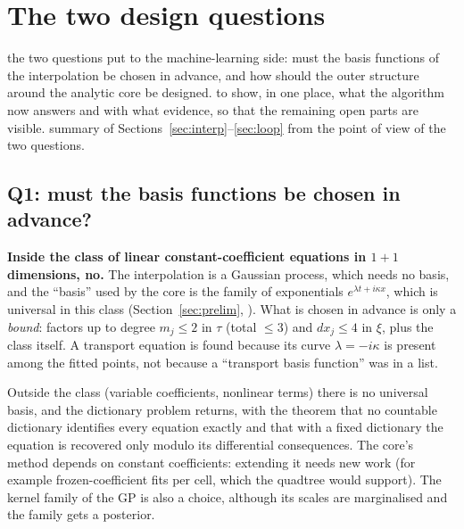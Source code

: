\section{The two design questions}\label{sec:q}
\sectionbrief
{the two questions put to the machine-learning side: must the basis functions of the interpolation be chosen in advance, and how should the outer structure around the analytic core be designed.}
{to show, in one place, what the algorithm now answers and with what evidence, so that the remaining open parts are visible.}
{summary of Sections~\ref{sec:interp}--\ref{sec:loop} from the point of view of the two questions.}

\subsection{Q1: must the basis functions be chosen in advance?}
\textbf{Inside the class of linear constant-coefficient equations in $1+1$ dimensions, no.} The interpolation is a Gaussian process, which needs no basis, and the ``basis'' used by the core is the family of exponentials $e^{\lambda t+i\kappa x}$, which is universal in this class (Section~\ref{sec:prelim}, ). What is chosen in advance is only a \emph{bound}: factors up to degree $m_j\le2$ in $\tau$ (total $\le3$) and $dx_j\le4$ in $\xi$, plus the class itself. A transport equation is found because its curve $\lambda=-i\kappa$ is present among the fitted points, not because a ``transport basis function'' was in a list.

\begin{caution}[title=Where the answer stops]
Outside the class (variable coefficients, nonlinear terms) there is no universal basis, and the dictionary problem returns, with the theorem that no countable dictionary identifies every equation exactly and that with a fixed dictionary the equation is recovered only modulo its differential consequences. The core's method depends on constant coefficients: extending it needs new work (for example frozen-coefficient fits per cell, which the quadtree would support). The kernel family of the GP is also a choice, although its scales are marginalised and the family gets a posterior.
\end{caution}

